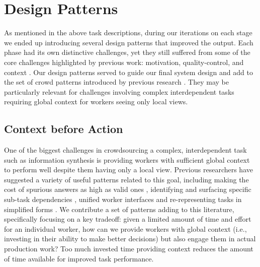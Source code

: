 \section{Design Patterns}

As mentioned in the above task descriptions, during our iterations on each stage we ended up introducing several design patterns that improved the output. Each phase had its own distinctive challenges, yet they still suffered from some of the core challenges highlighted by previous work: motivation, quality-control, and context \cite{kittur2013future}. Our design patterns served to guide our final system design and add to the set of crowd patterns introduced by previous research \cite{kittur2011crowdforge,bernstein2010soylent,kittur2013future,little2010turkit,bigham2010vizwiz,lasecki2012real,kulkarni2011turkomatic}. They may be particularly relevant for challenges involving complex interdependent tasks requiring global context for workers seeing only local views. 

\subsection{Context before Action}

One of the biggest challenges in crowdsourcing a complex, interdependent task such as information synthesis is providing workers with sufficient global context to perform well despite them having only a local view. Previous researchers have suggested a variety of useful patterns related to this goal, including making the cost of spurious answers as high as valid ones \cite{kittur2008crowdsourcing}, identifying and surfacing specific sub-task dependencies \cite{kulkarni2012collaboratively,retelny2014expert}, unified worker interfaces \cite{zhang2012human} and re-representing tasks in simplified forms \cite{andre2014crowd,Kittur:2012:CVM:2145204.2145357}. We contribute a set of patterns adding to this literature, specifically focusing on a key tradeoff: given a limited amount of time and effort for an individual worker, how can we provide workers with global context (i.e., investing in their ability to make better decisions) but also engage them in actual production work? Too much invested time providing context reduces the amount of time available for improved task performance.


